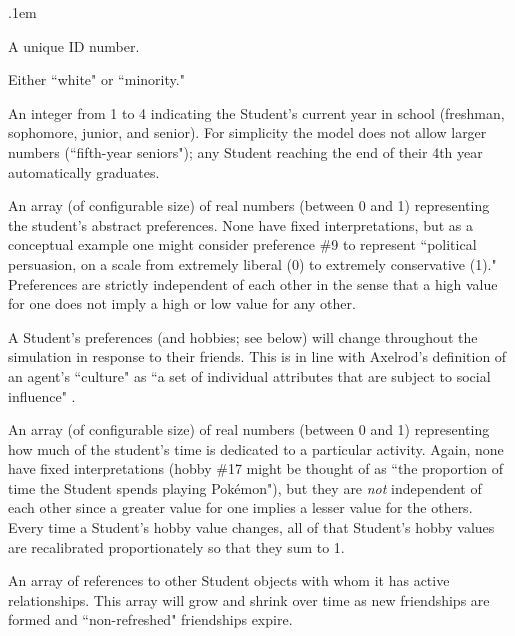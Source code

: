 \begin{description}
\itemsep.1em
\item[ID] A unique ID number.

\item[Race] Either ``white" or ``minority."

\item[Year] An integer from 1 to 4 indicating the Student's current year
in school (freshman, sophomore, junior, and senior). For simplicity the model
does not allow larger numbers (``fifth-year seniors"); any Student reaching
the end of their 4th year %
automatically graduates.

\item[Preferences] An array (of configurable size) of real numbers (between 0
and 1) representing the student's abstract preferences. None have fixed
interpretations, but as a conceptual example one might consider preference \#9
to represent ``political persuasion, on a scale from extremely liberal (0) to
extremely conservative (1)." Preferences are strictly independent of each
other in the sense that a high value for one does not imply a high or low
value for any other.

A Student's preferences (and hobbies; see below) will change throughout the
simulation in response to their friends. This is in line with Axelrod's
definition of an agent's ``culture" as ``a set of individual attributes that
are subject to social influence" \citeyear{axelrod_dissemination_1997}.

\item[Hobbies] An array (of configurable size) of real numbers (between 0 and
1) representing how much of the student's time is dedicated to a particular
activity. Again, none have fixed interpretations (hobby \#17 might be thought
of as ``the proportion of time the Student spends playing Pok\'emon"), but
they are \textit{not} independent of each other since a greater value for one
implies a lesser value for the others. Every time a Student's hobby value
changes, all of that Student's hobby values are recalibrated proportionately
so that they sum to 1.

\item[Friends] An array of references to other Student objects with whom
it has active relationships. This array will grow and shrink over time as new
friendships are formed and ``non-refreshed" friendships expire.

\end{description}

